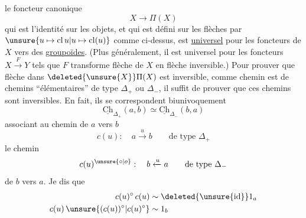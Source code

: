 le foncteur canonique
\[X\longrightarrow\Pi(X)\]
qui est l'identité sur les objets, et qui est défini sur les flèches par $\unsure{u\mapsto\mathrm{cl}\,u|u\mapsto\mathrm{cl}(u)}$ comme ci-dessus, est \uline{universel}  pour les foncteurs  de $X$ vers des \uline{groupoïdes}.
(Plus généralement, il est universel pour les foncteurs $X\xrightarrow{F}Y$ tels que $F$ transforme  flèche de $X$ en flèche inversible.)
Pour prouver que  flèche dans $\deleted{\unsure{X}}\Pi(X)$ est inversible, comme   chemin  est  de chemins ``élémentaires'' de type $\Delta_+$ ou $\Delta_-$, il suffit de prouver que ces chemins sont inversibles. En fait, ils se correspondent biunivoquement
\[\underline{\mathrm{Ch}}_{\Delta_+}(a,b)\simeq\underline{\mathrm{Ch}}_{\Delta_-}(b,a)\]
 associant au chemin de $a$ vers $b$
\[c(u):\quad a\xrightarrow{u}b\qquad\text{de type }\Delta_+\]
le chemin
\[c(u)^{\unsure{\circ|o}}:\quad b\xleftarrow{u}a\qquad\text{de type }\Delta_-\]
de $b$ vers $a$. Je dis que
\[\begin{aligned}
c(u)^\circ\,c(u)&\sim\deleted{\unsure{\mathrm{id}}}1_a\\
c(u)\,\unsure{(c(u))^\circ|c(u)^\circ}&\sim 1_b
\end{aligned}\]
